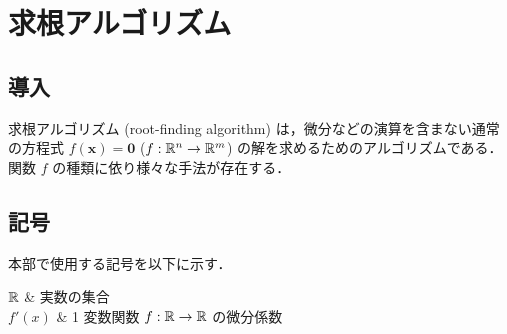 %

\part{求根アルゴリズム}

\chapter{導入}

求根アルゴリズム (root-finding algorithm)
は，微分などの演算を含まない通常の方程式
$f(\bm{x})=\bm{0}$ ($f : \mathbb{R}^n \to \mathbb{R}^m$)
の解を求めるためのアルゴリズムである．
関数 $f$ の種類に依り様々な手法が存在する．

\chapter{記号}

本部で使用する記号を以下に示す．

\begin{explainlist}
    $\mathbb{R}$ & 実数の集合 \\
    $f'(x)$ & 1 変数関数 $f : \mathbb{R} \to \mathbb{R}$ の微分係数 \\
\end{explainlist}


